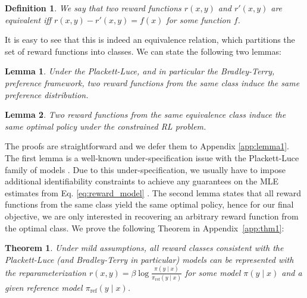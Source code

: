 \documentclass{article}
\newtheorem{theorem}{Theorem}
\newtheorem{lemma}{Lemma}
\newtheorem{definition}{Definition}
\begin{document}
\begin{definition}
We say that two reward functions $r(x, y)$ and $r'(x, y)$ are equivalent iff ${r(x, y)-r'(x, y) = f(x)}$ for some function $f$.
\end{definition}
It is easy to see that this is indeed an equivalence relation, which partitions the set of reward functions into classes. We can state the following two lemmas:

\begin{lemma}\label{lemma:same_prefrence} Under the Plackett-Luce, and in particular the Bradley-Terry, preference framework, two reward functions from the same class induce the same preference distribution.
\end{lemma}

\begin{lemma}\label{lemma:same_policy}
    Two reward functions from the same equivalence class induce the same optimal policy under the constrained RL problem.
\end{lemma}
The proofs are straightforward and we defer them to Appendix \ref{app:lemma1}. The first lemma is a well-known under-specification issue with the Plackett-Luce family of models \cite{plackett1975analysis}. Due to this under-specification, we usually have to impose additional identifiability constraints to achieve any guarantees on the MLE estimates from Eq. \ref{eq:reward_model} \cite{bong2022generalized}. The second lemma states that all reward functions from the same class yield the same optimal policy, hence for our final objective, we are only interested in recovering an arbitrary reward function from the optimal class. We prove the following Theorem in Appendix~\ref{app:thm1}:
\begin{theorem}\label{thm:main}
    Under mild assumptions, all reward classes consistent with the Plackett-Luce (and Bradley-Terry in particular) models can be represented with the reparameterization ${r(x, y) = \beta \log \frac{\pi(y\mid x)}{\pi_\text{ref}(y\mid x)}}$ for some model $\pi(y\mid x)$ and a given reference model $\pi_\text{ref}(y \mid x)$.
\end{theorem}
\end{document}
